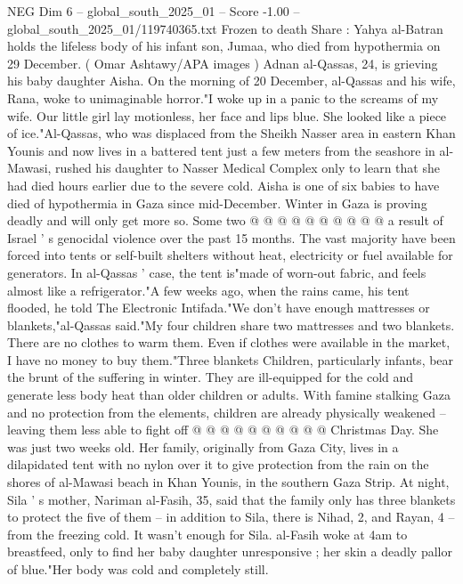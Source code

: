 \begin{textsample}{NEG Dim 6 – global\_south\_2025\_01 – Score -1.00 – global\_south\_2025\_01/119740365.txt}  \label{ex:f6_neg_008}
Frozen to death Share : Yahya al-Batran holds the lifeless body of his infant son, Jumaa, who died from hypothermia on 29 December. ( Omar Ashtawy/APA images ) Adnan al-Qassas, 24, is grieving his baby daughter Aisha.
On the morning of 20 December, al-Qassas and his wife, Rana, woke to unimaginable horror."I woke up in a panic to the screams of my wife.
Our little girl lay motionless, her face and lips blue.
She looked like a piece of ice."Al-Qassas, who was displaced from the Sheikh Nasser area in eastern Khan Younis and now lives in a battered tent just a few meters from the seashore in al-Mawasi, rushed his daughter to Nasser Medical Complex only to learn that she had died hours earlier due to the severe cold.
Aisha is one of six babies to have died of hypothermia in Gaza since mid-December.
Winter in Gaza is proving deadly and will only get more so.
Some two @ @ @ @ @ @ @ @ @ @ a result of Israel ' s genocidal violence over the past 15 months.
The vast majority have been forced into tents or self-built shelters without heat, electricity or fuel available for generators.
In al-Qassas ' case, the tent is"made of worn-out fabric, and feels almost like a refrigerator."A few weeks ago, when the rains came, his tent flooded, he told The Electronic Intifada."We don't have enough mattresses or blankets,"al-Qassas said."My four children share two mattresses and two blankets.
There are no clothes to warm them.
Even if clothes were available in the market, I have no money to buy them."Three blankets Children, particularly infants, bear the brunt of the suffering in winter.
They are ill-equipped for the cold and generate less body heat than older children or adults.
With famine stalking Gaza and no protection from the elements, children are already physically weakened -- leaving them less able to fight off @ @ @ @ @ @ @ @ @ @ Christmas Day.
She was just two weeks old.
Her family, originally from Gaza City, lives in a dilapidated tent with no nylon over it to give protection from the rain on the shores of al-Mawasi beach in Khan Younis, in the southern Gaza Strip.
At night, Sila ' s mother, Nariman al-Fasih, 35, said that the family only has three blankets to protect the five of them -- in addition to Sila, there is Nihad, 2, and Rayan, 4 -- from the freezing cold.
It wasn't enough for Sila. al-Fasih woke at 4am to breastfeed, only to find her baby daughter unresponsive ; her skin a deadly pallor of blue."Her body was cold and completely still.

\end{textsample}
